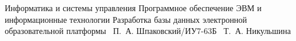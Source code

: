 \documentclass{bmstu}
\begin{document}
\renewcommand{\thelstlisting}{\arabic{lstlisting}}

\makecourseworktitle
    {Информатика и системы управления}
    {Программное обеспечение ЭВМ и информационные технологии}
    {Разработка базы данных электронной образовательной платформы}
    {~П.~А. Шпаковский/ИУ7-63Б}
    {~Т.~А. Никульшина}
    {}

\maketableofcontents



% 
% 
% 
% 

\makebibliography

% 
\end{document}
